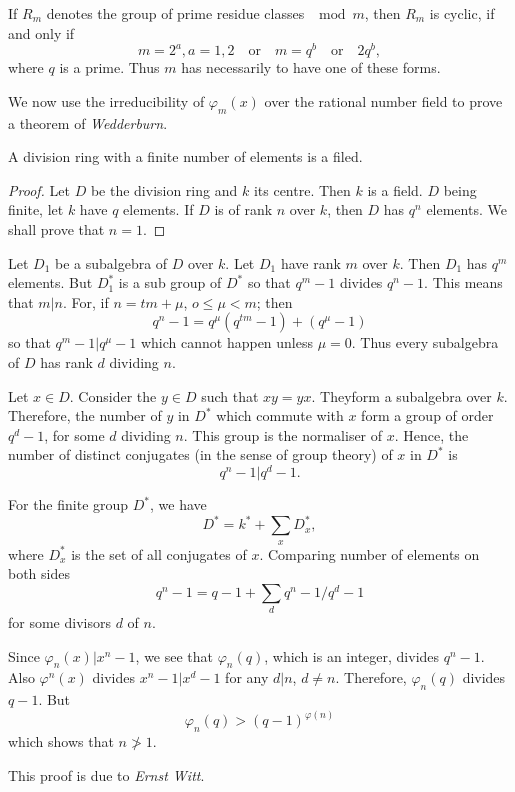  If $R_m$ denotes the group of prime residue classes $\mod m$, then
 $R_m$ is cyclic, if and only if   
 $$
 m=2^a, a=1,2 \quad \text{or} \quad m =q^b \quad \text{or} \quad 2q^b,
 $$
 where $q$ is a prime. Thus $m$ has necessarily to have one of these
 forms. 
 
 We now use the irreducibility of $\varphi_m (x)$ over the rational
 number field to prove a theorem of \textit{Wedderburn}. 

 \begin{thm}\label{c6:thm5}%
A division ring with a finite number of elements is a filed. 
 \end{thm} 

 \begin{proof}
Let $D$ be the division ring and $k$ its centre. Then $k$ is a
field. $D$ being finite, let $k$ have $q$ elements. If $D$ is of rank
$n$ over $k$, then $D$ has $q^n$ elements. We shall prove that $n =1$.     
 \end{proof}
  
Let $D_1$ be a subalgebra of $D$ over $k$. Let $D_1$ have rank $m$
over $k$. Then $D_1$ has $q^m$ elements. But $D^*_1$ is a sub group of
$D^*$ so that $q^m-1$ divides $q^n-1$. This means that $m|n$. For, if
$n =tm + \mu$, $o \le \mu < m $; then    
$$
q^n-1 = q^\mu (q^{tm}-1) + (q^\mu -1)
$$
so that $q^m -1 | q^\mu -1$ which cannot happen unless $\mu=0$. Thus
every subalgebra of $D$ has rank $d$ dividing $n$. 

Let $x \in D$. Consider the $y \in D$ such that
$xy=yx$. They\pageoriginale form a subalgebra over $k$. Therefore, the
number of $y$ 
in $D^*$ which commute with $x$ form a group of order $q^d-1$, for
some $d$ dividing $n$. This group is the normaliser of $x$. Hence, the
number of distinct conjugates (in the sense of group theory) of $x$ in
$D^*$ is  
$$
q^n-1| q^d-1.
$$

For the finite group $D^*$, we have
$$
D^* = k^* + \sum_x D^*_x,
$$
where $D^*_x$ is the set of all conjugates of $x$. Comparing number of
elements on both sides 
$$
q^n-1 = q-1 +\sum_d q^n-1 /q^d-1
$$ 
for some divisors $d$ of $n$.

Since $\varphi_n (x)| x^n-1$, we see that $\varphi_n (q)$, which is
an integer, divides $q^n-1$. Also $\varphi^n (x)$ divides $x^n-1 |
x^d-1$ for any $d|n$, $d \neq n$. Therefore, $\varphi_n (q)$ divides
$q-1$. But  
$$
\varphi_n (q) > (q-1)^{\varphi (n)}
$$
which shows that $ n \not > 1$.

This proof is due to \textit{Ernst Witt}.


